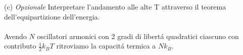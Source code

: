 \documentclass[a4paper]{article}
\begin{document}
        \begin{center}
        \end{center}
        (c) \emph{Opzionale} Interpretare l'andamento alle alte T attraverso il teorema dell'equipartizione dell'energia.
        \\
        \\
        Avendo $N$ oscillatori armonici con 2 gradi di libert\'a quadratici ciascuno con contributo $\frac{1}{2}k_BT$ ritroviamo la capacit\'a termica a $Nk_B$.
\end{document}
